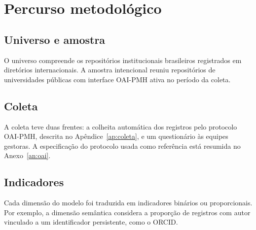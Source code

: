 \chapter{Percurso metodológico}
\label{cap:metodo}


\section{Universo e amostra}
O universo compreende os repositórios institucionais brasileiros registrados em diretórios internacionais. A amostra intencional reuniu repositórios de universidades públicas com interface OAI-PMH ativa no período da coleta.

\section{Coleta}
A coleta teve duas frentes: a colheita automática dos registros pelo protocolo OAI-PMH, descrita no Apêndice~\ref{ap:coleta}, e um questionário às equipes gestoras. A especificação do protocolo usada como referência está resumida no Anexo~\ref{an:oai}.

\section{Indicadores}
Cada dimensão do modelo foi traduzida em indicadores binários ou proporcionais. Por exemplo, a dimensão semântica considera a proporção de registros com autor vinculado a um identificador persistente, como o ORCID.
